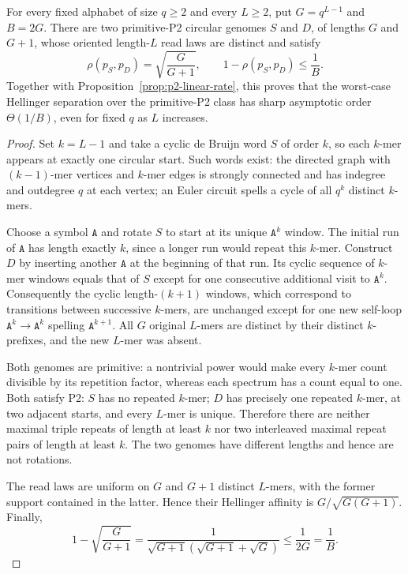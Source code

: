 \begin{proposition}
\label{prop:p2-linear-sharpness}
For every fixed alphabet of size $q\ge2$ and every
$L\ge2$, put $G=q^{L-1}$ and $B=2G$.
There are two primitive-P2 circular genomes
$S$ and $D$, of lengths $G$ and $G+1$,
whose oriented length-$L$ read laws are distinct and satisfy
\[
 \rho(p_S,p_D)=\sqrt{\frac{G}{G+1}},
 \qquad
 1-\rho(p_S,p_D)\le\frac1B.
\]
Together with Proposition~\ref{prop:p2-linear-rate},
this proves that the worst-case Hellinger separation
over the primitive-P2 class has sharp asymptotic
order $\Theta(1/B)$, even for fixed $q$ as $L$
increases.
\end{proposition}
\begin{proof}
Set $k=L-1$ and take a cyclic de Bruijn word $S$
of order $k$, so each $k$-mer appears at exactly
one circular start. Such words exist: the directed
graph with $(k-1)$-mer vertices and $k$-mer edges
is strongly connected and has indegree and outdegree
$q$ at each vertex; an Euler circuit spells a cycle
of all $q^k$ distinct $k$-mers.

Choose a symbol $\texttt{A}$ and rotate $S$
to start at its unique $\texttt{A}^k$ window.
The initial run of $\texttt{A}$ has length exactly
$k$, since a longer run would repeat this $k$-mer.
Construct $D$ by inserting another $\texttt{A}$
at the beginning of that run. Its cyclic sequence
of $k$-mer windows equals that of $S$ except for
one consecutive additional visit to $\texttt{A}^k$.
Consequently the cyclic length-$(k+1)$
windows, which correspond to transitions between
successive $k$-mers, are unchanged except for
one new self-loop $\texttt{A}^k\to\texttt{A}^k$
spelling $\texttt{A}^{k+1}$.
All $G$ original $L$-mers are distinct by their
distinct $k$-prefixes, and the new $L$-mer was absent.

Both genomes are primitive: a nontrivial power
would make every $k$-mer count divisible by
its repetition factor, whereas each spectrum
has a count equal to one.
Both satisfy P2: $S$ has no repeated $k$-mer;
$D$ has precisely one repeated $k$-mer,
at two adjacent starts, and every $L$-mer
is unique. Therefore there are neither maximal
triple repeats of length at least $k$ nor two
interleaved maximal repeat pairs of length
at least $k$. The two genomes have different
lengths and hence are not rotations.

The read laws are uniform on $G$ and $G+1$
distinct $L$-mers, with the former support
contained in the latter. Hence their Hellinger
affinity is $G/\sqrt{G(G+1)}$.
Finally,
\[
 1-\sqrt{\frac{G}{G+1}}
 =\frac{1}
 {\sqrt{G+1}(\sqrt{G+1}+\sqrt G)}
 \le\frac{1}{2G}=\frac1B.
\]
\end{proof}

